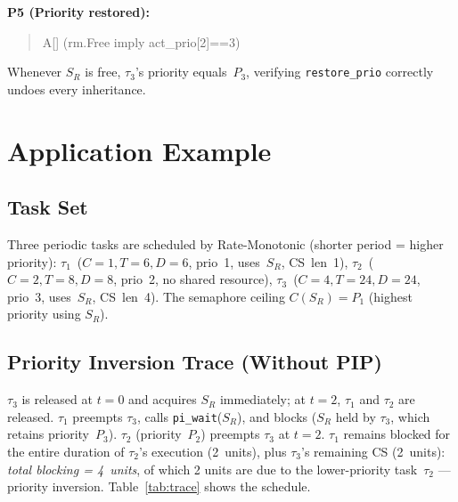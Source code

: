 \documentclass[conference]{IEEEtran}
\begin{document}
\textbf{P5 (Priority restored):}
\begin{quote}\small\ttfamily
A[] (rm.Free imply act\_prio[2]==3)
\end{quote}
Whenever $S_R$ is free, $\tau_3$'s priority equals~$P_3$, verifying
\texttt{restore\_prio} correctly undoes every inheritance.

\section{Application Example}
\label{sec:example}

\subsection{Task Set}

Three periodic tasks are scheduled by Rate-Monotonic (shorter period =
higher priority):
$\tau_1$~($C{=}1, T{=}6, D{=}6$, prio~1, uses~$S_R$, CS~len~1),
$\tau_2$~($C{=}2, T{=}8, D{=}8$, prio~2, no shared resource),
$\tau_3$~($C{=}4, T{=}24, D{=}24$, prio~3, uses~$S_R$, CS~len~4).
The semaphore ceiling $C(S_R) = P_1$ (highest priority using $S_R$).

\subsection{Priority Inversion Trace (Without PIP)}

$\tau_3$ is released at $t{=}0$ and acquires $S_R$ immediately;
at $t{=}2$, $\tau_1$ and $\tau_2$ are released.
$\tau_1$ preempts $\tau_3$, calls \texttt{pi\_wait}($S_R$), and blocks
($S_R$ held by $\tau_3$, which retains priority~$P_3$).
$\tau_2$ (priority~$P_2$) preempts $\tau_3$ at $t{=}2$.
$\tau_1$ remains blocked for the entire duration of $\tau_2$'s
execution (2~units), plus $\tau_3$'s remaining CS (2~units):
\emph{total blocking = 4~units}, of which 2 units are due to the
lower-priority task~$\tau_2$ --- priority inversion.
Table~\ref{tab:trace} shows the schedule.
\end{document}

